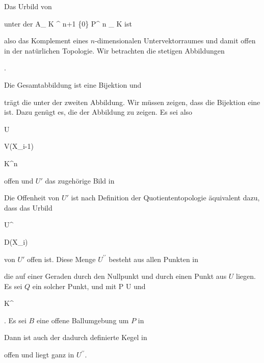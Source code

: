 {


Das Urbild von

 unter der
\maabb {} { { {\mathbb A}_{  {\mathbb K}  }^{ n+1  } } \setminus \{0\} } { {\mathbb P}^{ n }_{ {\mathbb K} }
} {}
ist

 also das Komplement eines $n$-dimensionalen Untervektorraumes und damit offen in der natürlichen Topologie. Wir betrachten die stetigen Abbildungen


 { . }


Die Gesamtabbildung ist eine Bijektion und

 trägt die
unter der zweiten Abbildung. Wir müssen zeigen, dass die Bijektion eine
ist. Dazu genügt es, die
der Abbildung zu zeigen. Es sei also


\mavergleichskette

{\vergleichskette

{ U
}

{ \subseteq }{ V(X_i-1)
}

{ \cong }{ {\mathbb K}^n
}

{    }{
}

{   }{
}

}
{}{}{}
offen und $U'$ das zugehörige Bild in

 Die Offenheit von $U'$ ist nach Definition der Quotiententopologie äquivalent dazu, dass das Urbild


\mavergleichskette

{\vergleichskette

{ U^{\prime \prime}
}

{ \subseteq }{ D(X_i)
}

{  }{
}

{    }{
}

{   }{
}

}
{}{}{}
von $U'$ offen ist. Diese Menge $U^{\prime \prime}$ besteht aus allen Punkten in

 die auf einer Geraden durch den Nullpunkt und durch einen Punkt aus $U$ liegen. Es sei $Q$ ein solcher Punkt, und   {  mit  }  { P \in U   }{ } und


\mavergleichskette

{\vergleichskette

{ \lambda
}

{ \in }{ {\mathbb K}^\times
}

{  }{
}

{    }{
}

{   }{
}

}
{}{}{.}
Es sei $B$ eine offene Ballumgebung um $P$ in

 Dann ist auch der dadurch definierte Kegel in

 offen und liegt ganz in $U^{\prime \prime}$.


}


